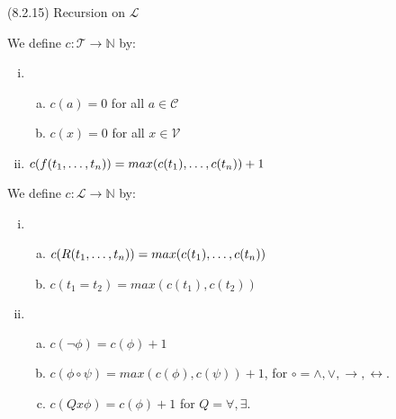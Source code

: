 \begin{frame}{(8.2.15) Recursion on $\mathcal{L}$}

We define $c:\mathcal{T}\to\mathbb{N}$ by:

	\begin{enumerate}[(i)]
	
		\item \begin{enumerate}[(a)]

			\item $c(a)=0$ for all $a\in\mathcal{C}$
			
			\item $c(x)=0$ for all $x\in \mathcal{V}$
	
			\end{enumerate}
			
		\item $c(f(t_1, \mathellipsis, t_n))=max(c(t_1), \mathellipsis, c(t_n))+1$
	
	\end{enumerate}

We define $c:\mathcal{L}\to\mathbb{N}$ by:
		\begin{enumerate}[(i)]
		
			\item  \begin{enumerate}[(a)]
			
				\item $c(R(t_1,\mathellipsis, t_n))=max(c(t_1), \mathellipsis, c(t_n))$
				
				\item $c(t_1=t_2)=max(c(t_1), c(t_2))$ 			
			\end{enumerate}
			
			\item \begin{enumerate}[(a)]
			
			\item $c(\neg\phi)=c(\phi)+1$
			\item $c(\phi\circ\psi)=max(c(\phi),c(\psi))+1$, for $\circ=\land,\lor,\to,\leftrightarrow$.
			
			\item $c(Qx\phi)=c(\phi)+1$ for $Q=\forall,\exists$.

		
		\end{enumerate}
		\end{enumerate}

\end{frame}

